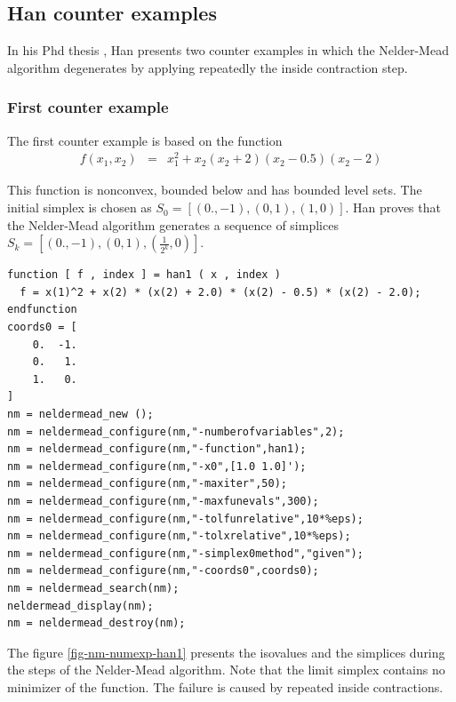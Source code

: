 \subsection{Han counter examples}

In his Phd thesis \cite{Han2000}, Han presents two counter examples
in which the Nelder-Mead algorithm degenerates by applying repeatedly
the inside contraction step.

\subsubsection{First counter example}

The first counter example is based on the function 
\begin{eqnarray}
\label{han-function1}
f(x_1,x_2) &=& x_1^2 + x_2 ( x_2 + 2 ) ( x_2 - 0.5 ) ( x_2 - 2 )
\end{eqnarray}

This function is nonconvex, bounded below and has bounded level 
sets. The initial simplex is chosen as $S_0 = [(0.,-1),(0,1),(1,0)]$.
Han proves that the Nelder-Mead algorithm generates a sequence of simplices
$S_k = [(0.,-1),(0,1),(\frac{1}{2^k},0)]$.

\lstset{language=scilabscript}
\begin{lstlisting}
function [ f , index ] = han1 ( x , index )
  f = x(1)^2 + x(2) * (x(2) + 2.0) * (x(2) - 0.5) * (x(2) - 2.0);
endfunction
coords0 = [
    0.  -1.  
    0.   1.  
    1.   0.  
]
nm = neldermead_new ();
nm = neldermead_configure(nm,"-numberofvariables",2);
nm = neldermead_configure(nm,"-function",han1);
nm = neldermead_configure(nm,"-x0",[1.0 1.0]');
nm = neldermead_configure(nm,"-maxiter",50);
nm = neldermead_configure(nm,"-maxfunevals",300);
nm = neldermead_configure(nm,"-tolfunrelative",10*%eps);
nm = neldermead_configure(nm,"-tolxrelative",10*%eps);
nm = neldermead_configure(nm,"-simplex0method","given");
nm = neldermead_configure(nm,"-coords0",coords0);
nm = neldermead_search(nm);
neldermead_display(nm);
nm = neldermead_destroy(nm);
\end{lstlisting}


The figure \ref{fig-nm-numexp-han1} presents the isovalues and the 
simplices during the steps of the Nelder-Mead algorithm.
Note that the limit simplex contains no minimizer of the function.
The failure is caused by repeated inside contractions.

